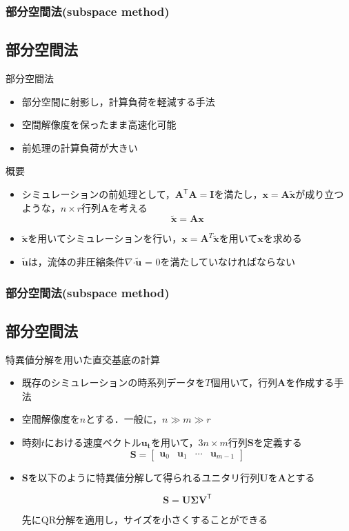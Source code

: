\documentclass[aspectratio=169,dvipdfmx,hyperref={bookmarks=true}]{beamer}
\begin{document}
   \begin{frame}
  \frametitle{部分空間法(subspace method)}
 \subsection{部分空間法}
\begin{block}{部分空間法}
\begin{itemize}
\item 部分空間に射影し，計算負荷を軽減する手法
\item 空間解像度を保ったまま高速化可能
\item 前処理の計算負荷が大きい
\end{itemize}
\end{block}

\begin{block}{概要}
\begin{itemize}
 \item シミュレーションの前処理として，$\bm{A}^{\mathsf T} \bm{A} = \bm{I}$を満たし，$\bm{x} = \bm{A}\bm{\widetilde{x}} $が成り立つような，$n \times r$行列$\bm{A}$を考える
 \[
 \bm{\widetilde{x}} = \bm{A}\bm{x}
 \]
\item $\bm{\widetilde{x}}$を用いてシミュレーションを行い，$\bm{x} = \bm{A}^{T}\bm{\widetilde{x}}$を用いて$\bm{x}$を求める
\item $\bm{\widetilde{u}}$は，流体の非圧縮条件$\nabla\boldsymbol{\cdot}\bm{\widetilde{u}}$ = 0を満たしていなければならない
\end{itemize}
\end{block}
 \end{frame}
   \begin{frame}
  \frametitle{部分空間法(subspace method)}
 \subsection{部分空間法}
   \begin{block}{特異値分解を用いた直交基底の計算}
   \begin{itemize}
   \item 既存のシミュレーションの時系列データを$T$個用いて，行列$\bm{A}$を作成する手法
\item 空間解像度を$n$とする．一般に，$n \gg m \gg r$ 
\item 時刻$t$における速度ベクトル$\bm{u_t}$を用いて，$3n\times m$行列$\bm{S}$を定義する
	 \[ \bm{S} = 
        		\begin{bmatrix}
   \bm{u}_0 & \bm{u}_1 &\cdots  & \bm{u}_{m-1}
\end{bmatrix}
\]
\item $\bm{S}$を以下のように特異値分解して得られるユニタリ行列$\bm{U}$を$\bm{A}$とする

\[
\bm{S} = \bm{U} \bm{\Sigma} \bm{V}^{\mathsf T}
\]

先にQR分解を適用し，サイズを小さくすることができる
\end{itemize}
\end{block}

 \end{frame}
\end{document}
